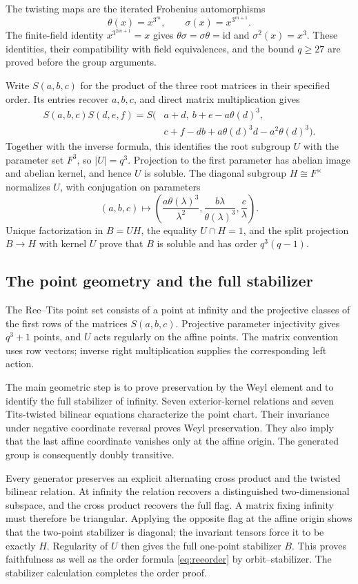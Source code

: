 \documentclass[11pt]{article}
\numberwithin{equation}{section}
\theoremstyle{definition}
\begin{document}
The twisting maps are the iterated Frobenius automorphisms
\[
 \theta(x)=x^{3^m},\qquad \sigma(x)=x^{3^{m+1}}.
\]
The finite-field identity $x^{3^{2m+1}}=x$ gives
$\theta\sigma=\sigma\theta=\mathrm{id}$ and
$\sigma^2(x)=x^3$. These identities, their compatibility with field
equivalences, and the bound $q\geq27$ are proved before the group
arguments.

Write $S(a,b,c)$ for the product of the three root matrices in their
specified order. Its entries recover $a,b,c$, and direct matrix
multiplication gives
\begin{align*}
 S(a,b,c)S(d,e,f)
  =S\bigl(&a+d,\ b+e-a\theta(d)^3,\\[-2pt]
          &c+f-db+a\theta(d)^3d-a^2\theta(d)^3\bigr).
\end{align*}
Together with the inverse formula, this identifies the root
subgroup $U$ with the parameter set $F^3$, so $|U|=q^3$.
Projection to the first parameter has abelian image and abelian kernel,
and hence $U$ is soluble. The diagonal subgroup $H\cong F^\times$
normalizes $U$, with conjugation on parameters
\[
 (a,b,c)\longmapsto
 \left(\frac{a\theta(\lambda)^3}{\lambda^2},
       \frac{b\lambda}{\theta(\lambda)^3},\frac{c}{\lambda}\right).
\]
Unique factorization in $B=UH$, the equality $U\cap H=1$, and the
split projection $B\to H$ with kernel $U$ prove that $B$ is soluble
and has order $q^3(q-1)$.

\subsection{The point geometry and the full stabilizer}

The Ree--Tits point set consists of a point at infinity and the
projective classes of the first rows of the matrices $S(a,b,c)$.
Projective parameter injectivity gives $q^3+1$ points, and $U$ acts
regularly on the affine points. The matrix convention uses row vectors;
inverse right multiplication supplies the corresponding left action.

The main geometric step is to prove preservation by the Weyl element
and to identify the full stabilizer of infinity. Seven exterior-kernel
relations and seven Tits-twisted bilinear equations characterize the
point chart. Their invariance under negative coordinate reversal proves
Weyl preservation. They also imply that the last affine coordinate
vanishes only at the affine origin. The generated group is consequently
doubly transitive.

Every generator preserves an explicit alternating cross product and the
twisted bilinear relation. At infinity the relation recovers a distinguished
two-dimensional subspace, and the cross product recovers the full flag.
A matrix fixing infinity must therefore be triangular. Applying the
opposite flag at the affine origin shows that the two-point stabilizer
is diagonal; the invariant tensors force it to be exactly $H$.
Regularity of $U$ then gives the full one-point stabilizer $B$.
This proves faithfulness as well as the order formula
\eqref{eq:reeorder} by orbit--stabilizer. The stabilizer calculation completes the order proof.
\end{document}

